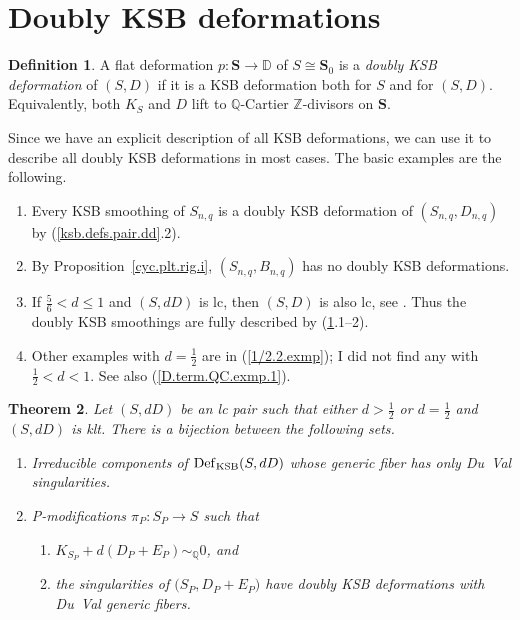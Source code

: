\documentclass{amsart}
\newtheorem{thm}{Theorem}%
\theoremstyle{definition}
\newtheorem{defn}[thm]{Definition}
\theoremstyle{remark}
\newcommand{\z}[0]{{\mathbb Z}}
\newcommand{\dd}[0]{{\mathbb D}}
\newcommand{\q}[0]{{\mathbb Q}}
\newcommand{\simq}[0]{\sim_{\q}}
\newcommand{\defsp}[0]{\operatorname{Def}}
\begin{document}
\section{Doubly KSB deformations}\label{0-1.sec}




\begin{defn}\label{2-KSB.defn} A flat deformation 
  $p: {\mathbf S}\to \dd$   of $S\cong {\mathbf S}_0$  is a {\it doubly KSB deformation} of $(S, D)$ if
  it is a KSB deformation both for $S$ and for  $(S, D)$.
  Equivalently, both $K_S$ and $D$ lift to $\q$-Cartier $\z$-divisors on
  ${\mathbf S}$.

  Since we have an explicit description of all  KSB deformations,
  we can use it to describe all doubly KSB deformations in most cases. The basic examples are the following.
\begin{enumerate}
 \item Every KSB smoothing of $S_{n,q}$ is a
  doubly KSB deformation of  $(S_{n,q}, D_{n,q})$ by (\ref{ksb.defs.pair.dd}.2).
\item By Proposition~\ref{cyc.plt.rig.i}, $(S_{n,q}, B_{n,q})$ has no doubly KSB deformations.
\item 
  If  $\frac56<d\leq 1$ and $(S,dD)$ is lc, then $(S, D)$ is also lc, see \cite[3.44]{kk-singbook}.
  Thus the doubly KSB smoothings are fully described by (\ref{2-KSB.defn}.1--2).
\item Other examples with $d=\frac12$ are in (\ref{1/2.2.exmp});
  I did not find any  with $\frac12< d<1$. See also (\ref{D.term.QC.exmp.1}).
\end{enumerate}

\end{defn}




\begin{thm}\label{K+D.KSB.P.thm}  Let $(S, dD)$ be an lc pair such that
  either $d>\frac12 $ or $d=\frac12$ and   $(S, dD)$ is klt.
  There is a bijection between the following sets.
\begin{enumerate}
\item  \label{K+D.KSB.P.thm.1}
  Irreducible components of $\defsp_{\rm KSB}(S, dD)$ whose generic fiber has only Du~Val singularities.
\item \label{K+D.KSB.P.thm.2}
  P-modifications $\pi_P:S_P\to S$ such that
  \begin{enumerate}
\item  \label{K+D.KSB.P.thm.2.a} $K_{S_P}+d(D_P+E_P)\simq 0$, and
\item   \label{K+D.KSB.P.thm.2.b} the singularities of $\bigl(S_P, D_P+E_P\bigr)$ have doubly KSB deformations with Du~Val  generic fibers.
 \end{enumerate}
\end{enumerate}
\end{thm}
\end{document}
